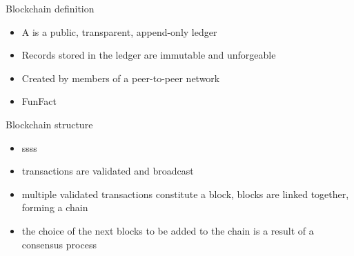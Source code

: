 \begin{frame}{Blockchain definition}

\begin{itemize}
\item A  is a public, transparent,
append-only ledger
\item Records stored in the ledger are immutable
and unforgeable
\item Created by members of a peer-to-peer
network
\item FunFact
\end{itemize}

\end{frame}



\begin{frame}{Blockchain structure}

\begin{itemize}
\item ssss
\item transactions are validated and broadcast
\item multiple validated transactions
constitute a block, blocks are linked together,
forming a chain
\item the choice of the next blocks to be
added to the chain is a result of a consensus
process
\end{itemize}

\end{frame}

